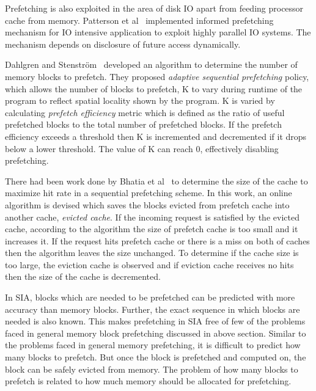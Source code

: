 Prefetching is also exploited in the area of disk IO apart from feeding processor cache
from memory. Patterson et al~\cite{Patterson1994} implemented informed prefetching
mechanism for IO intensive application to exploit highly parallel IO systems. The
mechanism depends on disclosure of future access dynamically.

Dahlgren and Stenström~\cite{Dahlgren1993} developed an algorithm to determine the
number of memory blocks to prefetch. They proposed
\textit{adaptive sequential prefetching} policy, which allows the number of blocks
to prefetch, K to vary during runtime of the program to reflect spatial locality
shown by the program. K is varied by calculating \textit{prefetch efficiency} metric
which is defined as the ratio of useful prefetched blocks to the total number of
prefetched blocks. If the prefetch efficiency exceeds a threshold then K is
incremented and decremented if it drops below a lower threshold. The value of K
can reach 0, effectively disabling prefetching.

There had been work done by Bhatia et al~\cite{Bhatia2010} to determine the size of
the cache to maximize hit rate in a sequential prefetching scheme. In this work, an
online algorithm is devised which saves the blocks evicted from prefetch cache
into another cache, \textit{evicted cache}. If the incoming request is satisfied
by the evicted cache, according to the algorithm the size of prefetch cache is too
small and it increases it. If the request hits prefetch cache or there is a miss
on both of caches then the algorithm leaves the size unchanged. To determine if
the cache size is too large, the eviction cache is observed and if eviction cache
receives no hits then the size of the cache is decremented.

In SIA, blocks which are needed to be prefetched can be predicted with more accuracy
than memory blocks. Further, the exact sequence in which blocks are needed is also known.
This makes prefetching in SIA free of few of the problems faced in general memory
block prefetching discussed in above section. Similar to the problems faced in general
memory prefetching, it is difficult to predict how many blocks to prefetch. But
once the block is prefetched and computed on, the block can be safely evicted from
memory. The problem of how many blocks to prefetch is related to how much memory
should be allocated for prefetching.
